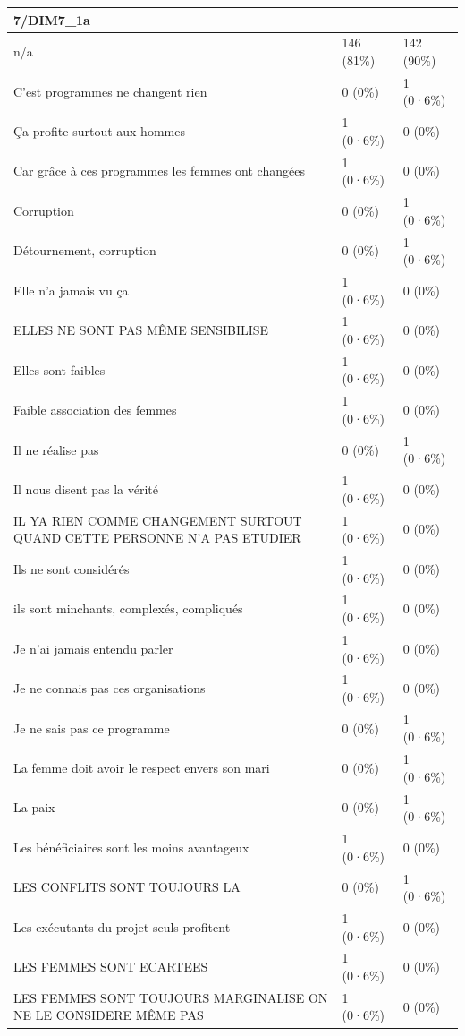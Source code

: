 \documentclass[
]{book}
\begin{document}
\begin{tabular}{l|l|l}
\hline
7/DIM7\_1a &  & \\
\hline
n/a & 146 (81\%) & 142 (90\%)\\
\hline
C'est programmes ne changent rien & 0 (0\%) & 1 (0·6\%)\\
\hline
Ça profite surtout aux hommes & 1 (0·6\%) & 0 (0\%)\\
\hline
Car grâce à ces programmes les femmes ont changées & 1 (0·6\%) & 0 (0\%)\\
\hline
Corruption & 0 (0\%) & 1 (0·6\%)\\
\hline
Détournement, corruption & 0 (0\%) & 1 (0·6\%)\\
\hline
Elle n'a jamais vu ça & 1 (0·6\%) & 0 (0\%)\\
\hline
ELLES NE SONT PAS MÊME SENSIBILISE & 1 (0·6\%) & 0 (0\%)\\
\hline
Elles sont faibles & 1 (0·6\%) & 0 (0\%)\\
\hline
Faible association des femmes & 1 (0·6\%) & 0 (0\%)\\
\hline
Il ne réalise pas & 0 (0\%) & 1 (0·6\%)\\
\hline
Il nous disent pas la vérité & 1 (0·6\%) & 0 (0\%)\\
\hline
IL YA RIEN COMME CHANGEMENT SURTOUT QUAND CETTE PERSONNE N'A PAS ETUDIER & 1 (0·6\%) & 0 (0\%)\\
\hline
Ils ne sont considérés & 1 (0·6\%) & 0 (0\%)\\
\hline
ils sont minchants, complexés, compliqués & 1 (0·6\%) & 0 (0\%)\\
\hline
Je n'ai jamais entendu parler & 1 (0·6\%) & 0 (0\%)\\
\hline
Je ne connais pas ces organisations & 1 (0·6\%) & 0 (0\%)\\
\hline
Je ne sais pas ce programme & 0 (0\%) & 1 (0·6\%)\\
\hline
La femme doit avoir le respect envers son mari & 0 (0\%) & 1 (0·6\%)\\
\hline
La paix & 0 (0\%) & 1 (0·6\%)\\
\hline
Les bénéficiaires sont les moins avantageux & 1 (0·6\%) & 0 (0\%)\\
\hline
LES CONFLITS SONT TOUJOURS LA & 0 (0\%) & 1 (0·6\%)\\
\hline
Les exécutants du projet seuls profitent & 1 (0·6\%) & 0 (0\%)\\
\hline
LES FEMMES SONT ECARTEES & 1 (0·6\%) & 0 (0\%)\\
\hline
LES FEMMES SONT TOUJOURS MARGINALISE ON NE LE CONSIDERE MÊME PAS & 1 (0·6\%) & 0 (0\%)\\

\end{tabular}
\end{document}
